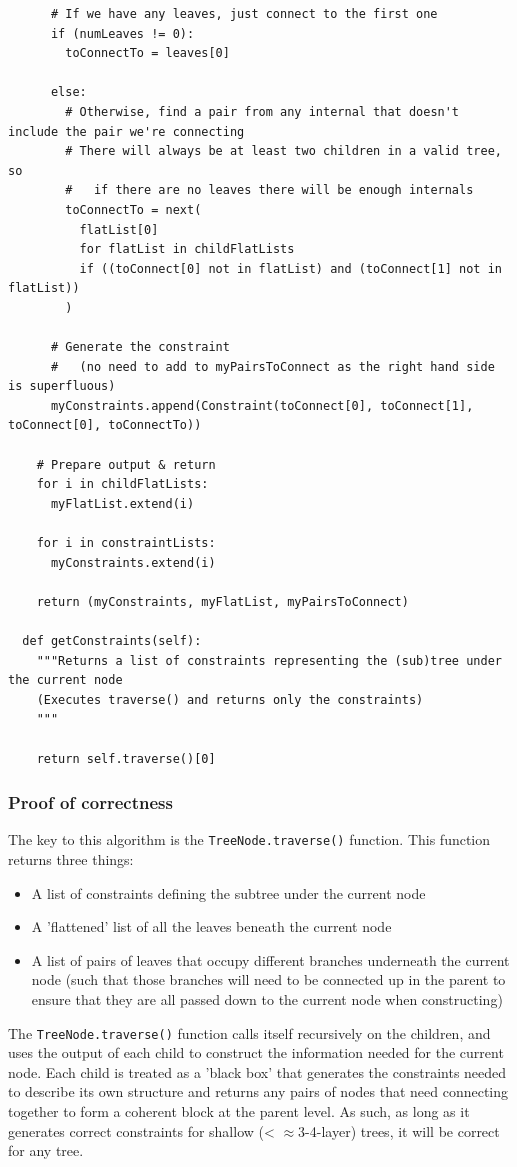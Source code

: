 \documentclass[11pt]{article} %
\begin{document}
\begin{landscape}
\begin{lstlisting}
      # If we have any leaves, just connect to the first one
      if (numLeaves != 0):
        toConnectTo = leaves[0]
      
      else:
        # Otherwise, find a pair from any internal that doesn't include the pair we're connecting
        # There will always be at least two children in a valid tree, so
        #   if there are no leaves there will be enough internals
        toConnectTo = next(
          flatList[0]
          for flatList in childFlatLists
          if ((toConnect[0] not in flatList) and (toConnect[1] not in flatList))
        )
      
      # Generate the constraint
      #   (no need to add to myPairsToConnect as the right hand side is superfluous)
      myConstraints.append(Constraint(toConnect[0], toConnect[1], toConnect[0], toConnectTo))
    
    # Prepare output & return
    for i in childFlatLists:
      myFlatList.extend(i)
    
    for i in constraintLists:
      myConstraints.extend(i)

    return (myConstraints, myFlatList, myPairsToConnect)
  
  def getConstraints(self):
    """Returns a list of constraints representing the (sub)tree under the current node
    (Executes traverse() and returns only the constraints)
    """

    return self.traverse()[0]
\end{lstlisting}
\end{landscape}

\subsubsection{Proof of correctness}
The key to this algorithm is the \texttt{TreeNode.traverse()} function. This function returns three things:
\begin{itemize}
	\item A list of constraints defining the subtree under the current node
	\item A 'flattened' list of all the leaves beneath the current node
	\item A list of pairs of leaves that occupy different branches underneath the current node (such that those branches will need to be connected up in the parent to ensure that they are all passed down to the current node when constructing)
\end{itemize}

The \texttt{TreeNode.traverse()} function calls itself recursively on the children, and uses the output of each child to construct the information needed for the current node. Each child is treated as a 'black box' that generates the constraints needed to describe its own structure and returns any pairs of nodes that need connecting together to form a coherent block at the parent level. As such, as long as it generates correct constraints for shallow (< $\approx$3-4-layer) trees, it will be correct for any tree.
\end{document}
